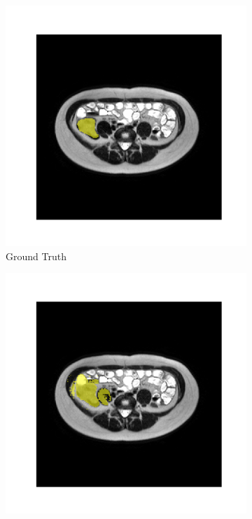 \begin{figure}[htp]
\centering
\begin{subfigure}[b]{0.47\textwidth}
\centering
\includegraphics[width=\textwidth]{./figures/seg_gt.png}
\caption{Ground Truth}
\label{fig:gt}
\end{subfigure}
\hfill
\begin{subfigure}[b]{0.47\textwidth}
\centering
\includegraphics[width=\textwidth]{./figures/seg_baseline.png}

\end{subfigure}
\end{figure}
